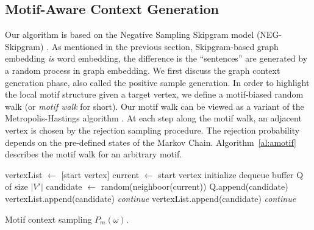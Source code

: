 \documentclass[letterpaper]{article}
\begin{document}
        \subsection{Motif-Aware Context Generation}

            Our algorithm is based on the Negative Sampling Skipgram model (NEG-Skipgram) \cite{skipgram}.
            As mentioned in the previous section, Skipgram-based graph embedding \emph{is} word embedding,
            the difference is the ``sentences'' are generated by a random process in graph embedding.
            We first discuss the graph context generation phase, also called the positive sample generation.
            In order to highlight the local motif structure given a target vertex, we define a motif-biased
            random walk (or \emph{motif walk} for short). Our motif walk can be viewed as a variant of
            the Metropolis-Hastings algorithm \cite{mh}. At each step along 
            the motif walk, an adjacent vertex is chosen by the rejection sampling procedure. The rejection
            probability depends on the pre-defined states of the Markov Chain. Algorithm~\ref{al:amotif} 
            describes the motif walk for an arbitrary motif.

            \begin{algorithm}
                \DontPrintSemicolon
                vertexList $\longleftarrow$ [start vertex] \;
                current $\longleftarrow$ start vertex \;
                initialize dequeue buffer Q of size $|V'|$ \;
                 {
                    candidate $\longleftarrow$ random(neighboor(current)) \;
                    Q.append(candidate) \;
                     {
                         {
                            vertexList.append(candidate) \;
                        } {
                            \emph{continue} \; 
                        }
                    } {
                         {
                            vertexList.append(candidate) \;
                        } {
                            \emph{continue} \;
                        }
                    }
                }
                \caption{Motif context sampling $P_m(\omega)$.}
                \label{al:amotif}
            \end{algorithm}
\end{document}
